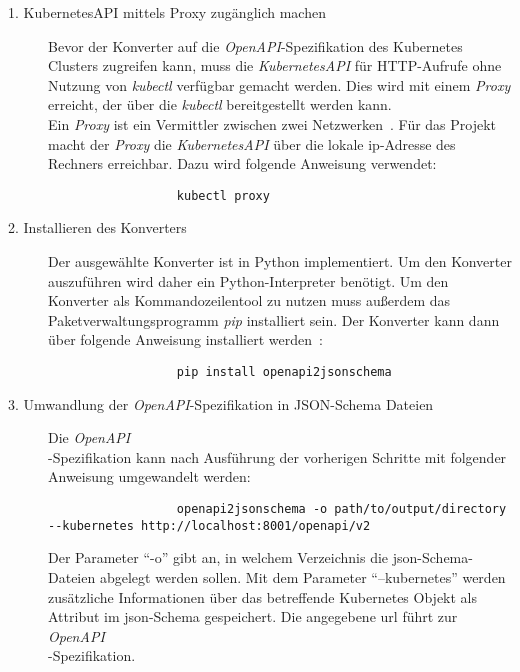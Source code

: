 \begin{description}
      \item[1. KubernetesAPI mittels Proxy zugänglich machen]
            Bevor der Konverter auf die \textit{OpenAPI}-Spezifikation des Kubernetes Clusters zugreifen kann, muss die \textit{KubernetesAPI}
            für HTTP-Aufrufe ohne Nutzung von \textit{kubectl} verfügbar gemacht werden. Dies wird mit einem \textit{Proxy} erreicht, der über die \textit{kubectl}
            bereitgestellt werden kann. \\
            Ein \textit{Proxy} ist ein Vermittler zwischen zwei Netzwerken~\cite{proxy-ryte-wiki,proxy-it-service-network}.
            Für das Projekt macht der \textit{Proxy} die \textit{KubernetesAPI} über die lokale \acs{ip}-Adresse des Rechners erreichbar.
            Dazu wird folgende Anweisung verwendet:
            \begin{verbatim}
                  kubectl proxy
            \end{verbatim}
      \item[2. Installieren des Konverters]
            Der ausgewählte Konverter ist in Python implementiert. Um den Konverter auszuführen wird daher ein Python-Interpreter benötigt.
            Um den Konverter als Kommandozeilentool zu nutzen muss außerdem das Paketverwaltungsprogramm \textit{pip} installiert sein.
            Der Konverter kann dann über folgende Anweisung installiert werden~\cite{openapi-to-json-schema}:
            \begin{verbatim}
                  pip install openapi2jsonschema
            \end{verbatim}
      \item[3. Umwandlung der \textit{OpenAPI}-Spezifikation in JSON-Schema Dateien]
            Die \textit{OpenAPI}\\-Spezifikation kann nach Ausführung der vorherigen Schritte mit folgender Anweisung umgewandelt werden:
            \begin{verbatim}
                  openapi2jsonschema -o path/to/output/directory --kubernetes http://localhost:8001/openapi/v2
            \end{verbatim}
            Der Parameter ``-o'' gibt an, in welchem Verzeichnis die \ac{json}-Schema-Dateien abgelegt werden sollen.
            Mit dem Parameter ``--kubernetes'' werden zusätzliche Informationen über das betreffende Kubernetes Objekt als Attribut im \ac{json}-Schema gespeichert.
            Die angegebene \ac{url} führt zur \textit{OpenAPI}\\-Spezifikation.
\end{description}

